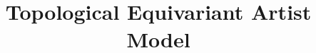\documentclass[xcolor={dvipsnames}, handout]{beamer}
\begin{document}
\title{Topological Equivariant Artist Model}

\end{document}
